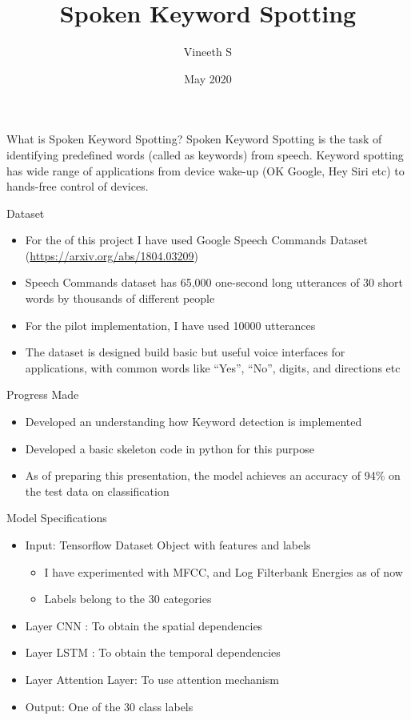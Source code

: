 \documentclass{beamer}
\title{Spoken Keyword Spotting}
\author{Vineeth S}
\date{May 2020}
\begin{document}
\maketitle

\begin{frame}{What is Spoken Keyword Spotting?}
	Spoken Keyword Spotting is the task of identifying predefined words (called as keywords) from speech. Keyword spotting has wide range of applications from device wake-up (OK Google, Hey Siri etc) to hands-free control of devices.
\end{frame}

\begin{frame}{Dataset}
	\begin{itemize}
		\item<1-> For the of this project I have used Google Speech Commands Dataset (\url{https://arxiv.org/abs/1804.03209})
		\item<2-> Speech Commands dataset has 65,000 one-second long utterances of 30 short words by thousands of different people
		\item<3-> For the pilot implementation, I have used 10000 utterances
		\item<4-> The dataset is designed build basic but useful voice interfaces for applications, with common words like “Yes”, “No”, digits, and directions etc
	\end{itemize}
\end{frame}

\begin{frame}{Progress Made}
	\begin{itemize}
	    \item<1-> Developed an understanding how Keyword detection is implemented
	    \item<2-> Developed a basic skeleton code in python for this purpose
	    \item<3-> As of preparing this presentation, the model achieves an accuracy of 94\% on the test data on classification
	\end{itemize}
\end{frame}

\begin{frame}{Model Specifications}
   \begin{itemize}
	    \item Input: Tensorflow Dataset Object with features and labels
		\begin{itemize}
			\item I have experimented with MFCC, and Log Filterbank Energies as of now
			\item Labels belong to the 30 categories
		\end{itemize}
		\item Layer CNN	: To obtain the spatial dependencies
	    \item Layer LSTM : To obtain the temporal dependencies
	    \item Layer Attention Layer: To use attention mechanism
	    \item Output: One of the 30 class labels
\end{itemize}
\end{frame}
\end{document}

